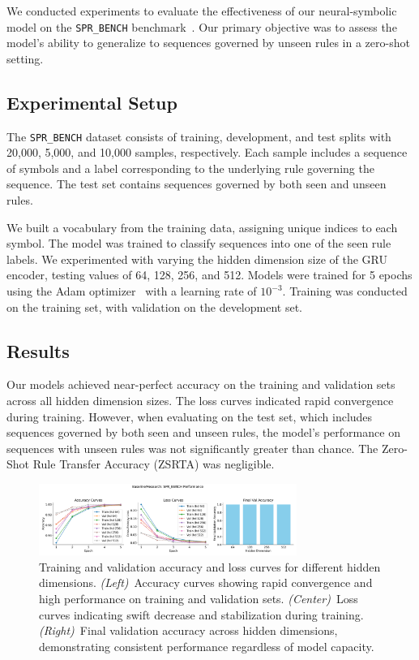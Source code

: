 \documentclass{article} %
\newcommand{\figleft}{{\em (Left)\/}}
\newcommand{\figcenter}{{\em (Center)\/}}
\newcommand{\figright}{{\em (Right)\/}}
\theoremstyle{plain}
\begin{document}
We conducted experiments to evaluate the effectiveness of our neural-symbolic model on the \texttt{SPR\_BENCH} benchmark~\citep{bortolotti2024anb}. Our primary objective was to assess the model's ability to generalize to sequences governed by unseen rules in a zero-shot setting.

\subsection{Experimental Setup}

The \texttt{SPR\_BENCH} dataset consists of training, development, and test splits with 20,000, 5,000, and 10,000 samples, respectively. Each sample includes a sequence of symbols and a label corresponding to the underlying rule governing the sequence. The test set contains sequences governed by both seen and unseen rules.

We built a vocabulary from the training data, assigning unique indices to each symbol. The model was trained to classify sequences into one of the seen rule labels. We experimented with varying the hidden dimension size of the GRU encoder, testing values of 64, 128, 256, and 512. Models were trained for 5 epochs using the Adam optimizer~\citep{goodfellow2016deep} with a learning rate of $10^{-3}$. Training was conducted on the training set, with validation on the development set.

\subsection{Results}

Our models achieved near-perfect accuracy on the training and validation sets across all hidden dimension sizes. The loss curves indicated rapid convergence during training. However, when evaluating on the test set, which includes sequences governed by both seen and unseen rules, the model's performance on sequences with unseen rules was not significantly greater than chance. The Zero-Shot Rule Transfer Accuracy (ZSRTA) was negligible.

\begin{figure}[ht]
\centering
\includegraphics[width=0.75\textwidth]{Baseline_Research_Aggregated.png}
\caption{Training and validation accuracy and loss curves for different hidden dimensions. \figleft\ Accuracy curves showing rapid convergence and high performance on training and validation sets. \figcenter\ Loss curves indicating swift decrease and stabilization during training. \figright\ Final validation accuracy across hidden dimensions, demonstrating consistent performance regardless of model capacity.}
\label{fig:accuracy_curves}
\end{figure}
\end{document}
